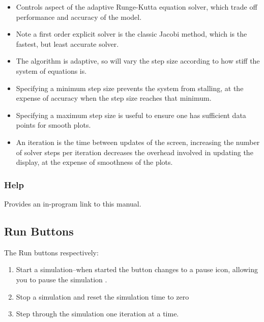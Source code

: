\begin{itemize}
\item Controls aspect of the adaptive Runge-Kutta equation solver, which
trade off performance and accuracy of the model. 
\item Note a first order explicit solver is the classic Jacobi method, which is the fastest,
but least accurate solver. 
\item The algorithm is adaptive, so will vary the
step size according to how stiff the system of equations
is. 
\item Specifying a minimum step size prevents the system from stalling,
at the expense of accuracy when the step size reaches that
minimum. 
\item Specifying a maximum step size is useful to ensure one has
sufficient data points for smooth plots.
\item An iteration is the time between updates of the screen, increasing the
number of solver steps per iteration decreases the overhead involved
in updating the display, at the expense of smoothness of the plots.
\end{itemize}

\subsubsection{Help}
\label{Help}

Provides an in-program link to this manual.

\subsection{Run Buttons}
\label{RunButtons}


The Run buttons respectively:
\begin{enumerate}
\item    Start a simulation--when started the button changes to a pause icon,
allowing you to pause the simulation .
\item Stop a simulation and reset the simulation time to zero
\item Step through the simulation one iteration at a time.
\end{enumerate}

%

